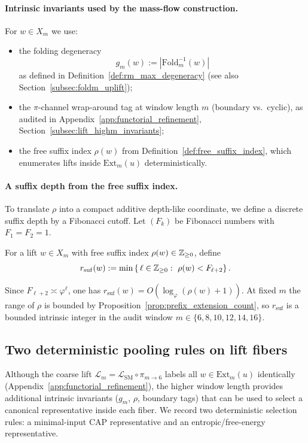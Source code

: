 \paragraph{Intrinsic invariants used by the mass-flow construction.}
For $w\in X_m$ we use:
\begin{itemize}
\item the folding degeneracy
\[
g_m(w):=\left|\mathrm{Fold}_m^{-1}(w)\right|
\]
as defined in Definition~\ref{def:rm_max_degeneracy} (see also Section~\ref{subsec:foldm_uplift});
\item the $\pi$-channel wrap-around tag at window length $m$ (boundary vs.\ cyclic),
as audited in Appendix~\ref{app:functorial_refinement}, Section~\ref{subsec:lift_highm_invariants};
\item the free suffix index $\rho(w)$ from Definition~\ref{def:free_suffix_index},
which enumerates lifts inside $\mathrm{Ext}_m(u)$ deterministically.
\end{itemize}

\paragraph{A suffix depth from the free suffix index.}
To translate $\rho$ into a compact additive depth-like coordinate,
we define a discrete suffix depth by a Fibonacci cutoff.
Let $(F_k)$ be Fibonacci numbers with $F_1=F_2=1$.
\begin{definition}\label{def:rho_suffix_depth}
For a lift $w\in X_m$ with free suffix index $\rho(w)\in\mathbb{Z}_{\ge 0}$, define
\[
r_{\mathrm{suf}}(w)
:=\min\left\{\,\ell\in\ZZ_{\ge 0}:\ \rho(w)<F_{\ell+2}\right\}.
\]
\end{definition}
\begin{remark}[Scale]\label{rem:rho_depth_scale}
Since $F_{\ell+2}\asymp \varphi^{\ell}$, one has
$r_{\mathrm{suf}}(w)=O(\log_\varphi(\rho(w)+1))$.
At fixed $m$ the range of $\rho$ is bounded by Proposition~\ref{prop:prefix_extension_count},
so $r_{\mathrm{suf}}$ is a bounded intrinsic integer in the audit window $m\in\{6,8,10,12,14,16\}$.
\end{remark}

\subsection{Two deterministic pooling rules on lift fibers}
\label{subsec:mass_flow_pooling}

Although the coarse lift $\mathcal{L}_m=\mathcal{L}_{\mathrm{SM}}\circ \pi_{m\to 6}$
labels all $w\in\mathrm{Ext}_m(u)$ identically (Appendix~\ref{app:functorial_refinement}),
the higher window length provides additional intrinsic invariants ($g_m$, $\rho$, boundary tags)
that can be used to select a canonical representative inside each fiber.
We record two deterministic selection rules:
a minimal-input CAP representative and an entropic/free-energy representative.

